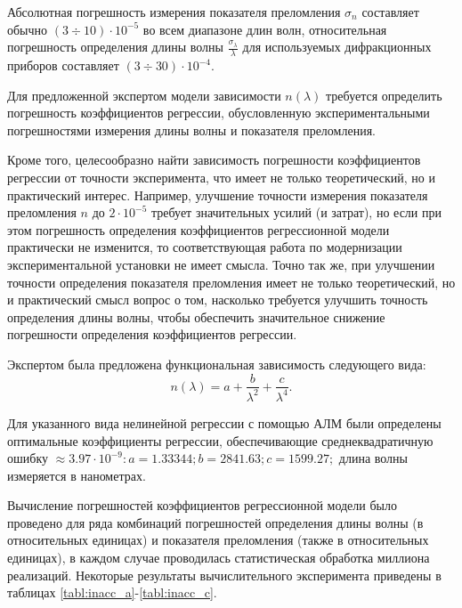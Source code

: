\documentclass[11pt,a4paper]{article}
\theoremstyle{definition}
\begin{document}
Абсолютная погрешность измерения показателя преломления $\sigma_n$
составляет обычно $(3 \div 10) \cdot 10^{-5}$ во всем диапазоне длин волн, относительная
погрешность определения длины волны $\frac{\sigma_{\lambda}}{\lambda}$ для используемых
дифракционных приборов составляет $(3 \div 30) \cdot 10^{-4}$.

Для предложенной экспертом модели зависимости $n(\lambda)$ требуется
определить погрешность коэффициентов регрессии,
обусловленную экспериментальными погрешностями измерения длины волны
и показателя преломления.

Кроме того, целесообразно найти зависимость
погрешности коэффициентов регрессии от точности эксперимента, что имеет
не только теоретический, но и практический интерес. Например, улучшение
точности измерения показателя преломления $n$ до $2 \cdot 10^{-5}$ требует значительных
усилий (и затрат), но если при этом погрешность определения коэффициентов
регрессионной модели практически не изменится, то соответствующая работа по
модернизации экспериментальной установки не имеет смысла. Точно так же,
при улучшении точности определения показателя преломления имеет не
только теоретический, но и практический смысл вопрос о том, насколько требуется
улучшить точность определения длины волны, чтобы
обеспечить значительное снижение погрешности определения коэффициентов
регрессии.

Экспертом была предложена функциональная зависимость
следующего вида:
\begin{equation}
  n(\lambda) = a + \frac{b}{\lambda^2} + \frac{c}{\lambda^4}.
  \label{eq:polymer_formula}
\end{equation}

Для указанного вида нелинейной регрессии с помощью АЛМ были
определены оптимальные коэффициенты регрессии, обеспечивающие
среднеквадратичную ошибку $\approx 3.97 \cdot 10^{-9}: a = 1.33344; b = 2841.63; c = 1599.27;$
длина волны измеряется в нанометрах.

Вычисление погрешностей коэффициентов регрессионной модели было
проведено для ряда комбинаций погрешностей определения длины волны (в
относительных единицах) и показателя преломления (также в относительных
единицах), в каждом случае проводилась статистическая обработка миллиона
реализаций. Некоторые результаты вычислительного эксперимента приведены
в таблицах \ref{tabl:inacc_a}-\ref{tabl:inacc_c}.
\end{document}
